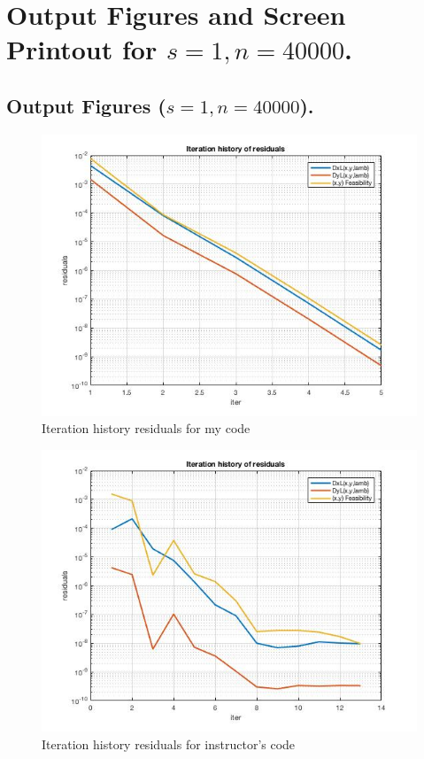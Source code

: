 \clearpage
\section{Output Figures and Screen Printout for $s=1,n=40000$.}
\subsection{Output Figures ($s=1,n=40000$).}
\begin{figure}[H]
\centering
\includegraphics[width=12cm]{F_7/F_1_2.jpg}
\caption{Iteration history residuals for my code}
\end{figure}
\begin{figure}[H]
\centering
\includegraphics[width=12cm]{F_7/F_1_3.jpg}
\caption{Iteration history residuals for instructor's code}
\end{figure}

